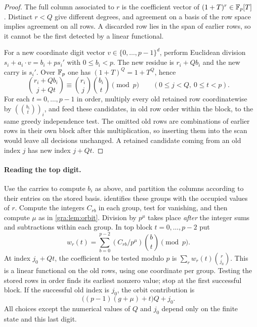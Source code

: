 
\begin{proof}
The full column associated to $r$ is the coefficient vector of
$(1+T)^r\in\mathbb{F}_p[T]$. Distinct $r<Q$ give different degrees, and agreement
on a basis of the row space implies agreement on all rows. A discarded row
lies in the span of earlier rows, so it cannot be the first detected by a
linear functional.

For a new coordinate digit vector $v\in\{0,\dots,p-1\}^d$, perform
Euclidean division $s_i+a_i\cdot v=b_i+ps_i'$ with $0\le b_i<p$. The new
residue is $r_i+Qb_i$ and the new carry is $s_i'$. Over $\mathbb{F}_p$ one has
$(1+T)^Q=1+T^Q$, hence
\[
 \binom{r_i+Qb_i}{j+Qt}\equiv\binom{r_i}{j}\binom{b_i}{t}\pmod p
 \qquad(0\le j<Q,\ 0\le t<p).
\]
For each $t=0,\dots,p-1$ in order, multiply every old retained row
coordinatewise by $(\binom{b_i}{t})_i$, and feed these candidates, in old
row order within the block, to the same greedy independence test. The
omitted old rows are combinations of earlier rows in their own block after
this multiplication, so inserting them into the scan would leave all
decisions unchanged. A retained candidate coming from an old index $j$ has
new index $j+Qt$.
\end{proof}

\paragraph{Reading the top digit.}
Use the carries to compute $b_i$ as above, and partition the columns
according to their entries on the stored basis. 
identifies these groups with the occupied values of $r$. Compute the
integers $C_{rb}$ in each group, test for vanishing, and then compute
$\mu$ as in \cref{gra:lem:orbit}. Division by $p^\mu$ takes place
\emph{after} the integer sums and subtractions within each group. In top
block $t=0,\dots,p-2$ put
\[
 w_r(t)=\sum_{b=0}^{p-2}(C_{rb}/p^\mu)\binom bt\pmod p .
\]
At index $j_0+Qt$, the coefficient to be tested modulo $p$ is
$\sum_rw_r(t)\binom r{j_0}$. This is a linear functional on the old rows,
using one coordinate per group. Testing the stored rows in order finds its
earliest nonzero value; stop at the first successful block. If the
successful old index is $j_0$, the orbit contribution is
\[
 \bigl((p-1)(g+\mu)+t\bigr)Q+j_0 .
\]
All choices except the numerical values of $Q$ and $j_0$ depend only on
the finite state and this last digit.

